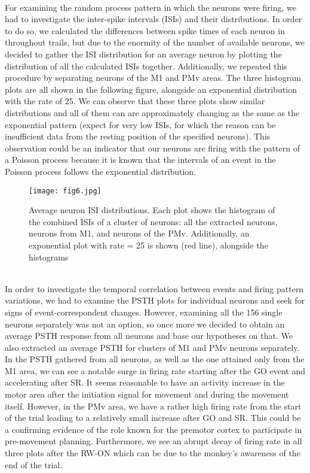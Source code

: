 \documentclass[9pt,twocolumn]{paper-template}
\begin{document}
\\
For examining the random process pattern in which the neurons were firing, we had to investigate the inter-spike intervals (ISIs) and their distributions. In order to do so, we calculated the differences between spike times of each neuron in throughout   trails, but due to the enormity of the number of available neurons, we decided to gather the ISI distribution for an average neuron by plotting the distribution of all the calculated ISIs together. Additionally, we repeated this procedure by separating neurons of the M1 and PMv areas. The three histogram plots are all shown in the following figure, alongside an exponential distribution with the rate of 25. We can observe that these three plots show similar distributions and all of them can are approximately changing as the same as the exponential pattern (expect for very low ISIs, for which the reason can be insufficient data from the resting position of the specified neurons). This observation could be an indicator that our neurons are firing with the pattern of a Poisson process because it is known that the intervals of an event in the Poisson process follows the exponential distribution.\\
\begin{figure}%
\centering
\texttt{[image: fig6.jpg]}
\caption{Average neuron ISI distributions. Each plot shows the histogram of the combined ISIs of a cluster of neurons: all the extracted neurons, neurons from M1, and neurons of the PMv. Additionally, an exponential plot with rate = 25 is shown (red line), alongside the histograms}
\label{fig:frog}
\end{figure}
\\
In order to investigate the temporal correlation between events and firing pattern variations, we had to examine the PSTH plots for individual neurons and seek for signs of event-correspondent changes. However, examining all the 156 single neurons separately was not an option, so once more we decided to obtain an average PSTH response from all neurons and base our hypotheses on that. We also extracted an average PSTH for clusters of M1 and PMv neurons separately. In the PSTH gathered from all neurons, as well as the one attained only from the M1 area, we can see a notable surge in firing rate starting after the GO event and accelerating after SR. It seems reasonable to have an activity increase in the motor area after the initiation signal for movement and during the movement itself. However, in the PMv area, we have a rather high firing rate from the start of the trial leading to a relatively small increase after GO and SR. This could be a confirming evidence of the role known for the premotor cortex to participate in pre-movement planning. Furthermore, we see an abrupt decay of firing rate in all three plots after the RW-ON which can be due to the monkey’s awareness of the end of the trial.
\end{document}

